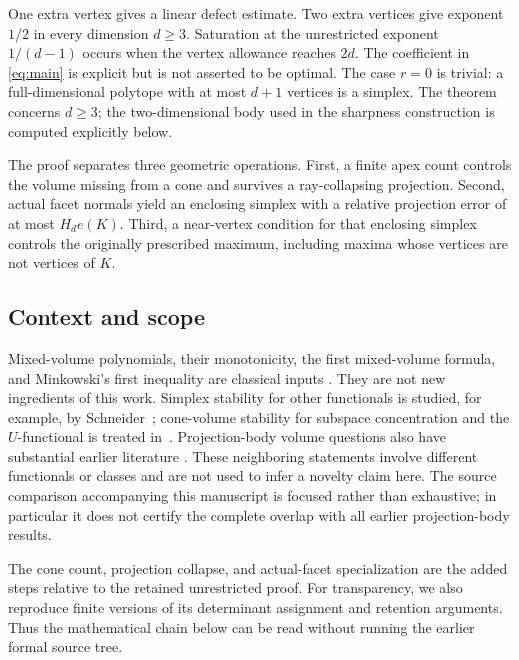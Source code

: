 One extra vertex gives a linear defect estimate. Two extra vertices give
exponent $1/2$ in every dimension $d\ge3$. Saturation at the unrestricted
exponent $1/(d-1)$ occurs when the vertex allowance reaches $2d$.
The coefficient in \eqref{eq:main} is explicit but is not asserted to be
optimal. The case $r=0$ is trivial: a full-dimensional polytope with at most
$d+1$ vertices is a simplex. The theorem concerns $d\ge3$; the two-dimensional
body used in the sharpness construction is computed explicitly below.

The proof separates three geometric operations. First, a finite apex count
controls the volume missing from a cone and survives a ray-collapsing
projection. Second, actual facet normals yield an enclosing simplex with a
relative projection error of at most $H_de(K)$. Third, a near-vertex
condition for that enclosing simplex controls the originally prescribed
maximum, including maxima whose vertices are not vertices of $K$.

\subsection{Context and scope}
Mixed-volume polynomials, their monotonicity, the first mixed-volume formula,
and Minkowski's first inequality are classical inputs
\cite{SchneiderBook,BS}. They are not new ingredients of this work.
Simplex stability for other functionals is studied, for example, by
Schneider~\cite{SchneiderStability}; cone-volume stability for subspace
concentration and the $U$-functional is treated in~\cite{BH}. Projection-body
volume questions also have substantial earlier literature
\cite{Brannen,Saroglou}. These neighboring statements involve different
functionals or classes and are not used to infer a novelty claim here.
The source comparison accompanying this manuscript is focused rather than
exhaustive; in particular it does not certify the complete overlap with
all earlier projection-body results.

The cone count, projection collapse, and actual-facet specialization are
the added steps relative to the retained unrestricted proof. For transparency,
we also reproduce finite versions of its determinant assignment and
retention arguments. Thus the mathematical chain below can be read without
running the earlier formal source tree.
